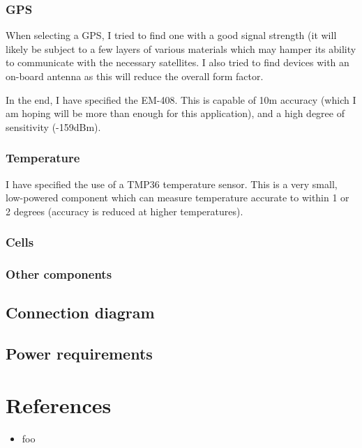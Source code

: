 \documentclass[a4paper, twoside]{article}
\begin{document}
\subsubsection{GPS}
When selecting a GPS, I tried to find one with a good signal strength (it will
likely be subject to a few layers of various materials which may hamper its
ability to communicate with the necessary satellites. I also tried to find
devices with an on-board antenna as this will reduce the overall form factor.

In the end, I have specified the EM-408. This is capable of 10m accuracy (which
I am hoping will be more than enough for this application), and a high degree of
sensitivity (-159dBm).

\subsubsection{Temperature}
I have specified the use of a TMP36 temperature sensor. This is a very small,
low-powered component which can measure temperature accurate to within 1 or 2
degrees (accuracy is reduced at higher temperatures).

\subsubsection{Cells}

\subsubsection{Other components}

\subsection{Connection diagram}

\subsection{Power requirements}

\section{References}
\begin{itemize}
	\item{foo}
\end{itemize}
\end{document}
